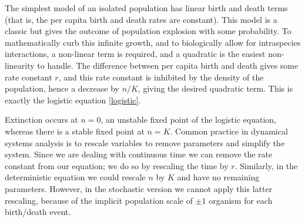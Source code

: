 The simplest model of an isolated population has linear birth and death terms (that is, the per capita birth and death rates are constant).
This model is a classic but gives the outcome of population explosion with some probability\cite{Nisbet1982}. %
To mathematically curb this infinite growth, and to biologically allow for intraspecies interactions, a non-linear term is required, and a quadratic is the easiest non-linearity to handle.
The difference between per capita birth and death gives some rate constant $r$, and this rate constant is inhibited by the density of the population, hence a decrease by $n/K$, giving the desired quadratic term.
This is exactly the logistic equation \ref{logistic}.

Extinction occurs at $n=0$, an unstable fixed point of the logistic equation, whereas there is a stable fixed point at $n=K$.
Common practice in dynamical systems analysis is to rescale variables to remove parameters and simplify the system.
Since we are dealing with continuous time we can remove the rate constant from our equation; we do so by rescaling the time by $r$.
Similarly, in the deterministic equation we could rescale $n$ by $K$ and have no remaining parameters.
However, in the stochastic version we cannot apply this latter rescaling, because of the implicit population scale of $\pm1$ organism for each birth/death event. %

